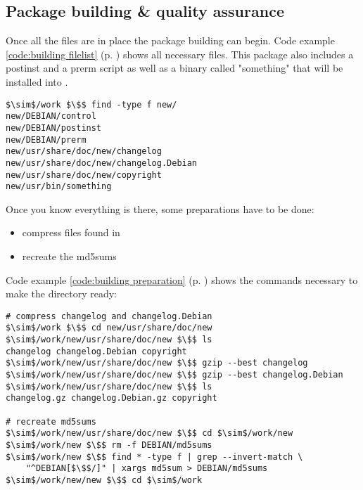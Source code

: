 \subsection{Package building \& quality assurance}\label{subsection:package %
building} Once all the files are in place the package building can begin. Code
example \ref{code:building filelist} (p. \pageref{code:building filelist}) shows
all necessary files.  This package also includes a postinst and a prerm script
as well as a binary called "something" that will be installed into
.
\begin{lstlisting}[label=code:building filelist,caption=A directory ready
to be made into a .deb package, float=ht]
$\sim$/work $\$$ find -type f new/
new/DEBIAN/control
new/DEBIAN/postinst
new/DEBIAN/prerm
new/usr/share/doc/new/changelog
new/usr/share/doc/new/changelog.Debian
new/usr/share/doc/new/copyright
new/usr/bin/something
\end{lstlisting}

Once you know everything is there, some preparations have to be done:
\begin{itemize}
  \item compress files found in 
  \item recreate the md5sums
\end{itemize}
Code example \ref{code:building preparation} (p. \pageref{code:building
preparation}) shows the commands necessary to make the directory ready:
\begin{lstlisting}[label=code:building preparation,caption=prepare a directory for
package creation, float=ht]
# compress changelog and changelog.Debian
$\sim$/work $\$$ cd new/usr/share/doc/new
$\sim$/work/new/usr/share/doc/new $\$$ ls
changelog changelog.Debian copyright
$\sim$/work/new/usr/share/doc/new $\$$ gzip --best changelog
$\sim$/work/new/usr/share/doc/new $\$$ gzip --best changelog.Debian
$\sim$/work/new/usr/share/doc/new $\$$ ls
changelog.gz changelog.Debian.gz copyright

# recreate md5sums
$\sim$/work/new/usr/share/doc/new $\$$ cd $\sim$/work/new
$\sim$/work/new $\$$ rm -f DEBIAN/md5sums
$\sim$/work/new $\$$ find * -type f | grep --invert-match \ 
	"^DEBIAN[$\$$/]" | xargs md5sum > DEBIAN/md5sums
$\sim$/work/new/new $\$$ cd $\sim$/work
\end{lstlisting}

